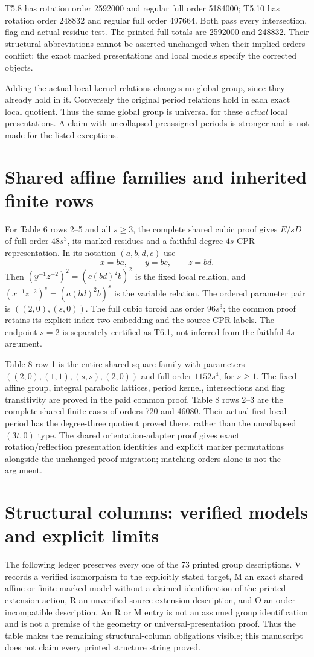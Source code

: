 \documentclass[10pt,a4paper]{article}
\begin{document}
T5.8 has rotation order 2592000 and regular full order 5184000;
T5.10 has rotation order 248832 and regular full order 497664.
Both pass every intersection, flag and actual-residue test. The printed
full totals are 2592000 and 248832. Their structural abbreviations cannot
be asserted unchanged when their implied orders conflict; the exact
marked presentations and local models specify the corrected objects.

Adding the actual local kernel relations changes no global group,
since they already hold in it. Conversely the original period
relations hold in each exact local quotient. Thus the same global
group is universal for these \emph{actual} local presentations.
A claim with uncollapsed preassigned periods is stronger and is not
made for the listed exceptions.

\section{Shared affine families and inherited finite rows}
For Table 6 rows 2--5 and all $s\ge3$, the complete shared cubic proof
gives $E/sD$ of full order $48s^3$, its marked residues and a faithful
degree-$4s$ CPR representation. In its notation $(a,b,d,c)$ use
\[x=ba,\qquad y=bc,\qquad z=bd.\]
Then $(y^{-1}z^{-2})^2=(c(bd)^2b)^2$ is the fixed local relation,
and $(x^{-1}z^{-2})^s=(a(bd)^2b)^s$ is the variable relation.
The ordered parameter pair is $((2,0),(s,0))$. The full cubic toroid
has order $96s^3$; the common proof retains its explicit index-two
embedding and the source CPR labels. The endpoint $s=2$ is separately
certified as T6.1, not inferred from the faithful-$4s$ argument.

Table 8 row 1 is the entire shared square family with parameters
$((2,0),(1,1),(s,s),(2,0))$ and full order $1152s^4$, for $s\ge1$.
The fixed affine group, integral parabolic lattices, period kernel,
intersections and flag transitivity are proved in the paid common
proof. Table 8 rows 2--3 are the complete shared finite cases of orders 720
and 46080. Their actual first local period has the degree-three quotient
proved there, rather than the uncollapsed $(3t,0)$ type. The shared orientation-adapter proof gives exact rotation/reflection
presentation identities and explicit marker permutations alongside the
unchanged proof migration; matching orders alone is not the argument.

\section{Structural columns: verified models and explicit limits}
The following ledger preserves every one of the 73 printed group descriptions.
V records a verified isomorphism to the explicitly stated target, M an exact
shared affine or finite marked model without a claimed identification of the
printed extension action, R an unverified source extension description, and
O an order-incompatible description. An R or M entry is not an assumed group
identification and is not a premise of the geometry or universal-presentation
proof. Thus the table makes the remaining structural-column obligations visible;
this manuscript does not claim every printed structure string proved.
\end{document}
